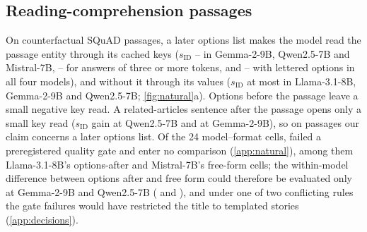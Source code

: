 \subsection{Reading-comprehension passages}\label{sec:natural}

On counterfactual SQuAD passages, a later options list makes the model read the passage entity through its cached keys ($s_{\mathrm{ID}}$ \JaSidOptaMistralSeven--\JaSidOptaQwenSeven{} in Gemma-2-9B, Qwen2.5-7B and Mistral-7B, \JaOnebSidMistralSeven--\JaOnebSidQwenSeven{} for answers of three or more tokens, and \JaSidLetaLlamaEight--\JaSidLetaGemmaNine{} with lettered options in all four models), and without it through its values ($s_{\mathrm{ID}}$ at most \JaSidNomLlamaEight{} in Llama-3.1-8B, Gemma-2-9B and Qwen2.5-7B; \cref{fig:natural}a). Options before the passage leave a small negative key read. A related-articles sentence after the passage opens only a small key read ($s_{\mathrm{ID}}$ gain \ci{\JaFiveDiffQwenSeven}{\JaFiveDiffQwenSevenLo}{\JaFiveDiffQwenSevenHi} at Qwen2.5-7B and \ci{\JaFiveDiffGemmaNine}{\JaFiveDiffGemmaNineLo}{\JaFiveDiffGemmaNineHi} at Gemma-2-9B), so on passages our claim concerns a later options list. Of the 24 model--format cells, \JaGateFailCells{} failed a preregistered quality gate and enter no comparison (\cref{app:natural}), among them Llama-3.1-8B's options-after and Mistral-7B's free-form cells; the within-model difference between options after and free form could therefore be evaluated only at Gemma-2-9B and Qwen2.5-7B (\JaThreeDiffGemmaNine{} and \JaThreeDiffQwenSeven), and under one of two conflicting rules the gate failures would have restricted the title to templated stories (\cref{app:decisions}).

